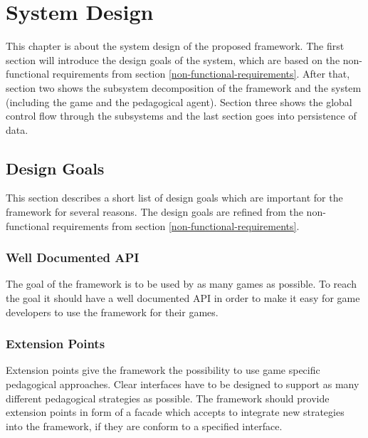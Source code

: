 \chapter{System Design}

This chapter is about the system design of the proposed framework. The first
section will introduce the design goals of the system, which
are based on the non-functional requirements from section
\ref{non-functional-requirements}. After that, section two shows the
subsystem decomposition of the framework and the system (including the game
and the pedagogical agent). Section three shows the global control flow through
the subsystems and the last section goes into persistence of data.


\section{Design Goals}
This section describes a short list of design goals which are important for
the framework for several reasons. The design goals are refined from the
non-functional requirements from section \ref{non-functional-requirements}.

\subsection{Well Documented API}
The goal of the framework is to be used by as many games as possible. To reach
the goal it should have a well documented API in order to make it easy for game
developers to use the framework for their games.

\subsection{Extension Points}
Extension points give the framework the possibility to use game specific
pedagogical approaches. Clear interfaces have to be designed to support as
many different pedagogical strategies as possible. The framework should
provide extension points in form of a facade which accepts to integrate new
strategies into the framework, if they are conform to a specified interface.


